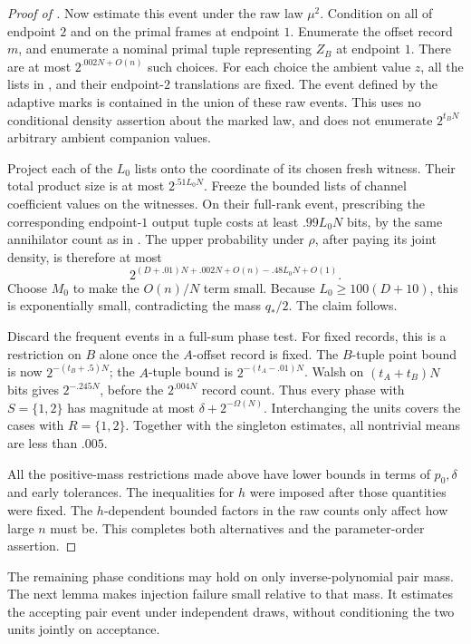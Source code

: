 \begin{proof}[Proof of ]
Now estimate this event under the raw law \(\mu^2\).
Condition on all of endpoint \(2\) and on the primal frames
at endpoint \(1\).  Enumerate the offset record \(m\), and
enumerate a nominal primal tuple representing \(Z_B\) at
endpoint \(1\).  There are at most \(2^{.002N+O(n)}\) such
choices.  For each choice the ambient value \(z\), all the
lists in , and their endpoint-\(2\)
translations are fixed.  The event defined by the adaptive
marks is contained in the union of these raw events.  This
uses no conditional density assertion about the marked law,
and does not enumerate \(2^{t_BN}\) arbitrary ambient
companion values.

Project each of the \(L_0\) lists onto the coordinate of its
chosen fresh witness.  Their total product size is at most
\(2^{.51L_0N}\).  Freeze the bounded lists of channel
coefficient values on the witnesses.  On their full-rank
event, prescribing the corresponding endpoint-\(1\) output
tuple costs at least \(.99L_0N\) bits, by the same annihilator
count as in .  The upper
probability under \(\rho\), after paying its joint density,
is therefore at most
\[
 2^{(D+.01)N+.002N+O(n)-.48L_0N+O(1)}.
\]
Choose \(M_0\) to make the \(O(n)/N\) term small.
Because \(L_0\ge100(D+10)\), this is exponentially small,
contradicting the mass \(q_*/2\).  The claim follows.

Discard the frequent events in a full-sum phase test.
For fixed records, this is a restriction on \(B\) alone once
the \(A\)-offset record is fixed.  The \(B\)-tuple point bound
is now \(2^{-(t_B+.5)N}\); the \(A\)-tuple bound is
\(2^{-(t_A-.01)N}\).  Walsh on \((t_A+t_B)N\) bits gives
\(2^{-.245N}\), before the \(2^{.004N}\) record count.
Thus every phase with \(S=\{1,2\}\) has magnitude at most
\(\delta+2^{-\Omega(N)}\).  Interchanging the units covers
the cases with \(R=\{1,2\}\).  Together with the singleton
estimates, all nontrivial means are less than \(.005\).

All the positive-mass restrictions made above have lower
bounds in terms of \(p_0,\delta\) and early tolerances.
The inequalities for \(h\) were imposed after those quantities
were fixed.  The \(h\)-dependent bounded factors in the raw
counts only affect how large \(n\) must be.  This completes
both alternatives and the parameter-order assertion.
\end{proof}

The remaining phase conditions may hold on only inverse-polynomial
pair mass.  The next lemma makes injection failure small relative
to that mass.  It estimates the accepting pair event under independent
draws, without conditioning the two units jointly on acceptance.

